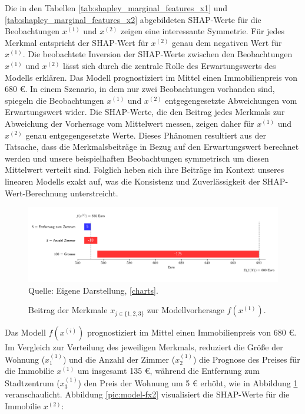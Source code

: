 Die in den Tabellen \ref{tab:shapley_marginal_features_x1} und \ref{tab:shapley_marginal_features_x2} 
abgebildeten SHAP-Werte für die Beobachtungen \( x^{(1)} \) und \( x^{(2)} \) zeigen eine interessante Symmetrie. 
Für jedes Merkmal entspricht der SHAP-Wert für \( x^{(2)} \) genau dem negativen Wert für \( x^{(1)} \). 
Die beobachtete Inversion der SHAP-Werte zwischen den Beobachtungen \( x^{(1)} \) und \( x^{(2)} \) 
lässt sich durch die zentrale Rolle des Erwartungswerts des Modells erklären. 
Das Modell prognostiziert im Mittel einen Immobilienpreis von 680 \euro. In einem Szenario, in dem nur zwei 
Beobachtungen vorhanden sind, spiegeln die Beobachtungen \( x^{(1)} \) und \( x^{(2)} \) entgegengesetzte 
Abweichungen vom Erwartungswert wider. Die SHAP-Werte, die den Beitrag jedes Merkmals zur Abweichung 
der Vorhersage vom Mittelwert messen, zeigen daher für \( x^{(1)} \) und \( x^{(2)} \) genau entgegengesetzte Werte. 
Dieses Phänomen resultiert aus der Tatsache, dass die Merkmalsbeiträge in Bezug auf den Erwartungswert 
berechnet werden und unsere beispielhaften Beobachtungen symmetrisch um diesen Mittelwert verteilt sind. 
Folglich heben sich ihre Beiträge im Kontext unseres linearen Modells exakt auf, was die Konsistenz und 
Zuverlässigkeit der SHAP-Wert-Berechnung unterstreicht.


\begin{figure}[!h]
    \caption{Beitrag der Merkmale $x_{j \in \{1, 2, 3\}}$ zur Modellvorhersage $f(x^{(1)})$.}
    \includegraphics[width=1\textwidth]{../scripts/images/model-output-x1.png}
    Quelle: Eigene Darstellung, \ref{charts}.
    \label{pic:model-fx1}
\end{figure}

Das Modell $f(x^{(i)})$
prognostiziert im Mittel einen Immobilienpreis von 680 \euro{}. Im Vergleich zur
Verteilung des jeweiligen Merkmals, reduziert die Größe der 
Wohnung ($x_1^{(1)}$) und die Anzahl der Zimmer ($x_2^{(1)}$) die Prognose 
des Preises für die Immobilie $x^{(1)}$ um insgesamt 135 \euro{}, während die Entfernung zum Stadtzentrum
($x_3^{(1)}$) den Preis der Wohnung um 5 \euro{} erhöht, wie in Abbildung 
\ref{pic:model-fx1} veranschaulicht. Abbildung \ref{pic:model-fx2} visualisiert die SHAP-Werte für die Immobilie $x^{(2)}$:

